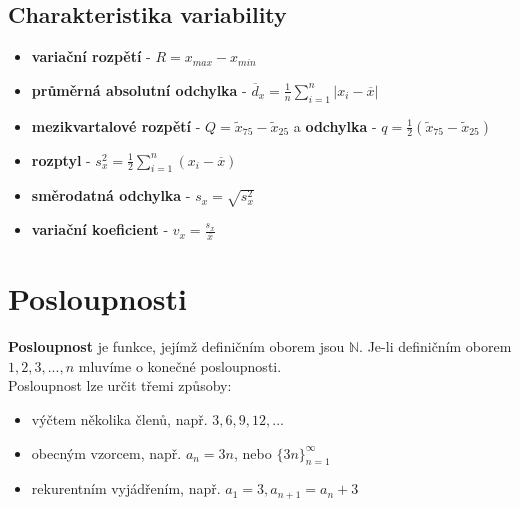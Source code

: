 \documentclass[12pt, a4paper]{article}
\begin{document}
\subsection*{Charakteristika variability}
\begin{itemize}
	\item \textbf{variační rozpětí} - $R = x_{max} - x_{min}$
	\item \textbf{průměrná absolutní odchylka} - $\overline{d}_x = \frac{1}{n}\sum_{i=1}^{n}|x_i - \overline{x}|$
	\item \textbf{mezikvartalové rozpětí} - $Q = \tilde{x}_{75} - \tilde{x}_{25}$ a \textbf{odchylka} - $q = \frac{1}{2}(\tilde{x}_{75}-\tilde{x}_{25})$
	\item \textbf{rozptyl} - $s_x^2 = \frac{1}{2}\sum_{i=1}^{n}(x_i-\overline{x})$
	\item \textbf{směrodatná odchylka} - $s_x = \sqrt{s_x^2}$
	\item \textbf{variační koeficient} - $v_x = \frac{s_x}{\overline{x}}$
\end{itemize}

\section{Posloupnosti}
\textbf{Posloupnost} je funkce, jejímž definičním oborem jsou $\mathbb{N}$. Je-li definičním oborem ${1,2,3,...,n}$ mluvíme o konečné posloupnosti.\\
Posloupnost lze určit třemi způsoby:
\begin{itemize}
	\item výčtem několika členů, např. $3, 6, 9, 12, ...$
	\item obecným vzorcem, např. $a_n = 3n$, nebo $\{3n\}_{n=1}^{\infty}$
	\item rekurentním vyjádřením, např. $a_1=3, a_{n+1}=a_n+3$
\end{itemize}
\end{document}
